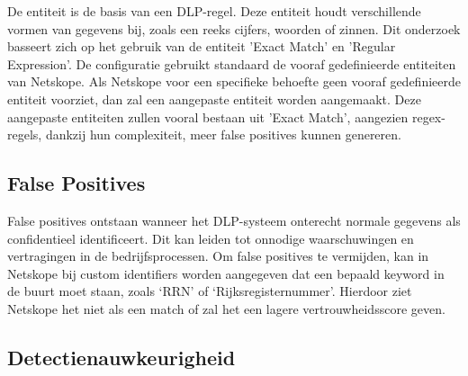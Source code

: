De entiteit is de basis van een DLP-regel. 
Deze entiteit houdt verschillende vormen van gegevens bij, zoals een reeks cijfers, woorden of zinnen. 
Dit onderzoek basseert zich op het gebruik van de entiteit 'Exact Match' en 'Regular Expression'. 
De configuratie gebruikt standaard de vooraf gedefinieerde entiteiten van Netskope. 
Als Netskope voor een specifieke behoefte geen vooraf gedefinieerde entiteit voorziet, dan zal een aangepaste entiteit worden aangemaakt.
Deze aangepaste entiteiten zullen vooral bestaan uit 'Exact Match', aangezien regex-regels, dankzij hun complexiteit, meer false positives kunnen genereren.



\subsection{False Positives}
\label{sec:false-positives-literatuurstudie}

False positives ontstaan wanneer het DLP-syst\-eem onterecht normale gegevens als confidentieel identificeert. 
Dit kan leiden tot onnodige waarschuwingen en vertragingen in de bedrijfsprocessen. 
Om false positives te vermijden, kan in Netskope bij custom identifiers worden aangegeven dat een bepaald keyword in de buurt moet staan, zoals `RRN' of `Rijksregisternummer'. 
Hierdoor ziet Netskope het niet als een match of zal het een lagere vertrouwheidsscore geven. 

\subsection{Detectienauwkeurigheid}
\label{sec:detectienauwkeurigheid-literatuurstudie}

